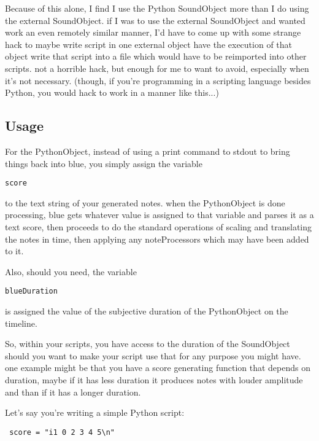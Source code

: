 Because of this alone, I find I use the Python SoundObject more than I
do using the external SoundObject. if I was to use the external
SoundObject and wanted work an even remotely similar manner, I'd have to
come up with some strange hack to maybe write script in one external
object have the execution of that object write that script into a file
which would have to be reimported into other scripts. not a horrible
hack, but enough for me to want to avoid, especially when it's not
necessary. (though, if you're programming in a scripting language
besides Python, you would hack to work in a manner like this...)

\subsection{Usage}

For the PythonObject, instead of using a print command to stdout to
bring things back into blue, you simply assign the variable

\begin{verbatim}
score
\end{verbatim}

to the text string of your generated notes. when the PythonObject is
done processing, blue gets whatever value is assigned to that variable
and parses it as a text score, then proceeds to do the standard
operations of scaling and translating the notes in time, then applying
any noteProcessors which may have been added to it.

Also, should you need, the variable

\begin{verbatim}
blueDuration
\end{verbatim}

is assigned the value of the subjective duration of the PythonObject on
the timeline.

So, within your scripts, you have access to the duration of the
SoundObject should you want to make your script use that for any purpose
you might have. one example might be that you have a score generating
function that depends on duration, maybe if it has less duration it
produces notes with louder amplitude and than if it has a longer
duration.

Let's say you're writing a simple Python script:

\begin{verbatim}
 score = "i1 0 2 3 4 5\n"
\end{verbatim}

